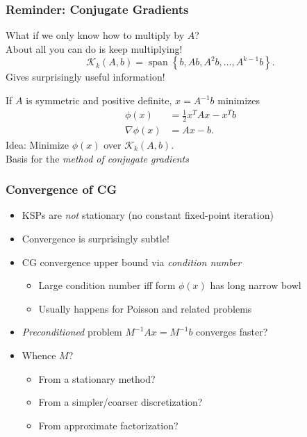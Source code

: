 \documentclass{beamer}
\newcommand{\calK}{\mathcal{K}}
\begin{document}
\begin{frame}
  \titlepage
\end{frame}


\begin{frame}
  \frametitle{Reminder: Conjugate Gradients}

  What if we only know how to multiply by $A$? \\
  About all you can do is keep multiplying!
  \[
    \calK_k(A,b) = \operatorname{span}\left\{ 
      b, A b, A^2 b, \ldots, A^{k-1} b \right\}.
  \]
  Gives surprisingly useful information!

  \vspace{5mm}
  If $A$ is symmetric and positive definite,
  $x = A^{-1}b$ minimizes
  \begin{align*}
    \phi(x) &= \frac{1}{2} x^T A x - x^T  b\\
    \nabla \phi(x) &= Ax - b.
  \end{align*}
  Idea: Minimize $\phi(x)$ over $\calK_k(A,b)$. \\
  Basis for the {\em method of conjugate gradients}
\end{frame}


\begin{frame}
  \frametitle{Convergence of CG}

  \begin{itemize}
  \item KSPs are {\em not} stationary (no constant fixed-point iteration)
  \item Convergence is surprisingly subtle!
  \item CG convergence upper bound via {\em condition number}
    \begin{itemize}
    \item Large condition number iff form $\phi(x)$ has long narrow bowl
    \item Usually happens for Poisson and related problems
    \end{itemize}
  \item {\em Preconditioned} problem
    $M^{-1} A x = M^{-1} b$ converges faster?
  \item Whence $M$?  
    \begin{itemize}
    \item From a stationary method?
    \item From a simpler/coarser discretization?
    \item From approximate factorization?
    \end{itemize}
  \end{itemize}
\end{frame}
\end{document}
